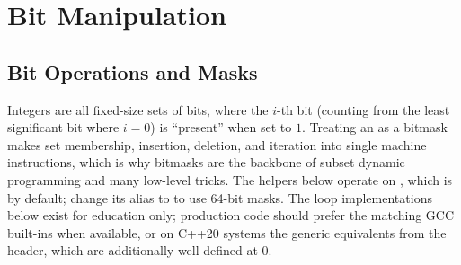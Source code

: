 \section{\texorpdfstring{Bit Manipulation}{1.7 Bit Manipulation}}
\setcounter{section}{7}
\setcounter{subsection}{0}
\subsection{Bit Operations and Masks}
\label{sec:1.7.1}
Integers are all fixed-size sets of bits, where the $i$-th bit (counting from the least significant bit where $i = 0$) is ``present'' when set to $1$. Treating an  as a bitmask makes set membership, insertion, deletion, and iteration into single machine instructions, which is why bitmasks are the backbone of subset dynamic programming and many low-level tricks. The helpers below operate on , which is  by default; change its alias to  to use 64-bit masks. The loop implementations below exist for education only; production code should prefer the matching GCC built-ins when available, or on C++20 systems the generic  equivalents from the  header, which are additionally well-defined at $0$.


